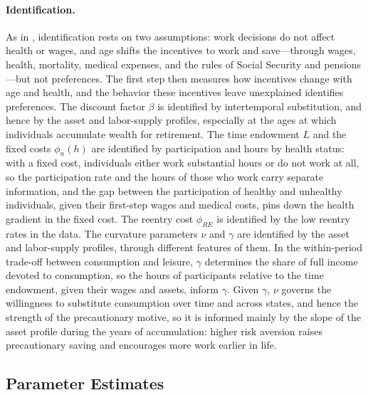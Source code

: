 \paragraph{Identification.} As in \citet{french2005effects}, identification rests on two assumptions: work decisions do not affect health or wages, and age shifts the incentives to work and save---through wages, health, mortality, medical expenses, and the rules of Social Security and pensions---but not preferences. The first step then measures how incentives change with age and health, and the behavior these incentives leave unexplained identifies preferences. The discount factor $\beta$ is identified by intertemporal substitution, and hence by the asset and labor-supply profiles, especially at the ages at which individuals accumulate wealth for retirement. The time endowment $L$ and the fixed costs $\phi_n(h)$ are identified by participation and hours by health status: with a fixed cost, individuals either work substantial hours or do not work at all, so the participation rate and the hours of those who work carry separate information, and the gap between the participation of healthy and unhealthy individuals, given their first-step wages and medical costs, pins down the health gradient in the fixed cost. The reentry cost $\phi_{RE}$ is identified by the low reentry rates in the data. The curvature parameters $\nu$ and $\gamma$ are identified by the asset and labor-supply profiles, through different features of them. In the within-period trade-off between consumption and leisure, $\gamma$ determines the share of full income devoted to consumption, so the hours of participants relative to the time endowment, given their wages and assets, inform $\gamma$. Given $\gamma$, $\nu$ governs the willingness to substitute consumption over time and across states, and hence the strength of the precautionary motive, so it is informed mainly by the slope of the asset profile during the years of accumulation: higher risk aversion raises precautionary saving and encourages more work earlier in life.

\subsection{Parameter Estimates}

